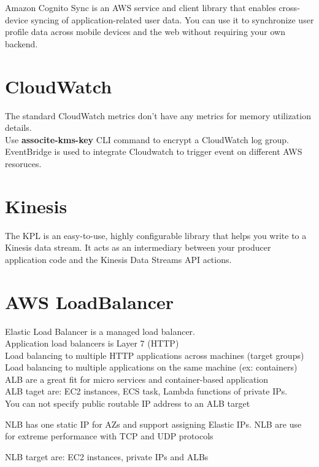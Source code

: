 \documentclass[12pt, letterpaper, twoside]{article}
\begin{document}
Amazon Cognito Sync is an AWS service and client library that enables cross-device syncing of application-related user data. 
You can use it to synchronize user profile data across mobile devices and the web without requiring your own backend.

\section{CloudWatch}
The standard CloudWatch metrics don't have any metrics for memory utilization details.\\

Use \textbf{associte-kms-key} CLI command to encrypt a CloudWatch log group.\\

EventBridge is used to integrate Cloudwatch to trigger event on different AWS resoruces.\\

\section{Kinesis}
The KPL is an easy-to-use, highly configurable library that helps you write to a Kinesis data stream. 
It acts as an intermediary between your producer application code and the Kinesis Data Streams API actions.\\

\section{AWS LoadBalancer}
Elastic Load Balancer is a managed load balancer.\\
Application load balancers is Layer 7 (HTTP)\\
Load balancing to multiple HTTP applications across machines (target groups)\\  
Load balancing to multiple applications on the same machine (ex: containers)\\
ALB are a great fit for micro services and container-based application\\
ALB taget are: EC2 instances, ECS task, Lambda functions of private IPs.\\

You can not specify public routable IP address to an ALB target

NLB has one static IP for AZs and support assigning Elastic IPs.
NLB are use for extreme performance with TCP and UDP protocols

NLB target are: EC2 instances, private IPs and ALBs\\
\end{document}
